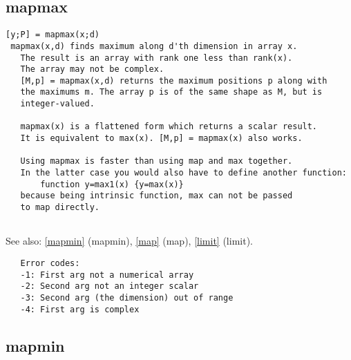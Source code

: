 \documentclass[a4paper]{article}
\begin{document}
\subsection{mapmax\label{mapmax}}

\begin{tscreen}
\begin{verbatim}
[y;P] = mapmax(x;d)
 mapmax(x,d) finds maximum along d'th dimension in array x.
   The result is an array with rank one less than rank(x).
   The array may not be complex.
   [M,p] = mapmax(x,d) returns the maximum positions p along with
   the maximums m. The array p is of the same shape as M, but is
   integer-valued.

   mapmax(x) is a flattened form which returns a scalar result.
   It is equivalent to max(x). [M,p] = mapmax(x) also works.

   Using mapmax is faster than using map and max together.
   In the latter case you would also have to define another function:
       function y=max1(x) {y=max(x)}
   because being intrinsic function, max can not be passed
   to map directly. 
   
\end{verbatim}

See also: \ref{mapmin} {(mapmin)}, \ref{map} {(map)}, \ref{limit} {(limit)}.
\begin{verbatim}
   Error codes:
   -1: First arg not a numerical array
   -2: Second arg not an integer scalar
   -3: Second arg (the dimension) out of range
   -4: First arg is complex 
\end{verbatim}
\end{tscreen}





\subsection{mapmin\label{mapmin}}
\end{document}
